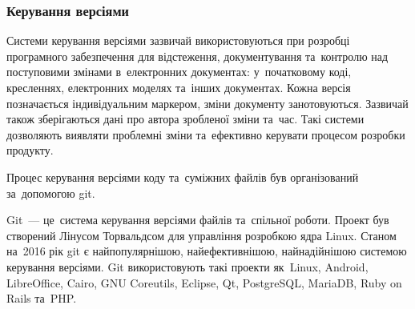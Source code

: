 \documentclass[a4paper,oneside,titlepage,14pt]{extarticle}
\begin{document}
				\subsubsection{Керування версіями}
					Системи керування версіями зазвичай використовуються при розробці програмного забезпечення для відстеження, документування та~контролю над поступовими змінами в~електронних документах: у~початковому коді, кресленнях, електронних моделях та~інших документах. Кожна версія позначається індивідуальним маркером, зміни документу занотовуються. Зазвичай також зберігаються дані про автора зробленої зміни та~час. Такі системи дозволяють виявляти проблемні зміни та~ефективно керувати процесом розробки продукту.\par
					Процес керування версіями коду та~суміжних файлів був організований за~допомогою git.\par
					Git~--- це~система керування версіями файлів та~спільної роботи. Проект був створений Лінусом Торвальдсом для управління розробкою ядра Linux. Станом на~2016 рік git є найпопулярнішою, найефективнішою, найнадійнішою системою керування версіями. Git використовують такі проекти як~Linux, Android, LibreOffice, Cairo, GNU Coreutils, Eclipse, Qt, Postgre\-SQL, Maria\-DB, Ruby on Rails та~PHP.\par
\end{document}
